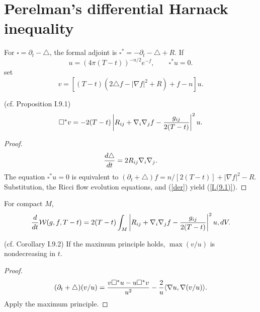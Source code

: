 \section{Perelman's differential Harnack inequality}
\label{I.9}
For $\square=\partial_t-\triangle$, the formal adjoint is
$\square^*=-\partial_t-\triangle+R$. If
\begin{equation}u=(4\pi(T-t))^{-n/2}e^{-f},\qquad\square^*u=0.\end{equation}
set
\begin{equation}\label{veqn}v=[(T-t)(2\triangle f-|\nabla f|^2+R)+f-n]u.\end{equation}
\begin{proposition}
  \label{prop:kl-perelman-s-differential-harnack-inequality-harnack-inequalities-proposition}
  (cf. Proposition I.9.1) \label{localized}
\begin{equation}\label{I.(9.1)}
\square^*v=-2(T-t)\left|R_{ij}+\nabla_i\nabla_jf-{g_{ij}\over2(T-t)}\right|^2u.
\end{equation}
\end{proposition}
\begin{proof}
\sketch
\begin{equation}\label{der}{d\triangle\over dt}=2R_{ij}\nabla_i\nabla_j.
\end{equation}
The equation $\square^*u=0$ is equivalent to
$(\partial_t+\triangle)f=n/[2(T-t)]+|\nabla f|^2-R$. Substitution, the Ricci
flow evolution equations, and (\ref{der}) yield (\ref{I.(9.1)}).
\end{proof}
For compact $M$,
\begin{equation}
{d\over dt}{\mathcal W}(g,f,T-t)=2(T-t)\int_M\left|R_{ij}+\nabla_i\nabla_jf-{g_{ij}\over2(T-t)}\right|^2u,dV.
\end{equation}
\begin{corollary}
  \label{cor:kl-perelman-s-differential-harnack-inequality-monotonicity-harnack-inequalities}
  (cf. Corollary I.9.2) \label{whenever}
If the maximum principle holds, $\max(v/u)$ is nondecreasing in $t$.
\end{corollary}
\begin{proof}
\sketch
\begin{equation}(\partial_t+\triangle)(v/u)=\frac{v\square^*u-u\square^*v}{u^2}-{2\over u}\langle\nabla u,\nabla(v/u)\rangle.
\end{equation}
Apply the maximum principle.
\end{proof}
